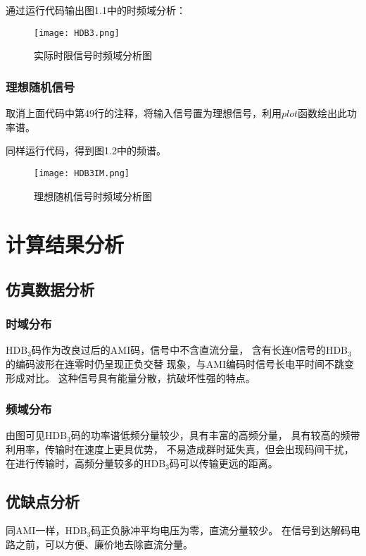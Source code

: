 \documentclass[AutoFakeBold]{LZUThesis}
\begin{document}
通过运行代码输出图1.1中的时频域分析：

\begin{figure}[htbp]
    \centering
    \texttt{[image: HDB3.png]}
    \caption{实际时限信号时频域分析图}
\end{figure}

\newpage

\subsection{理想随机信号}
取消上面代码中第49行的注释，将输入信号置为理想信号，利用$plot$函数绘出此功率谱。

同样运行代码，得到图1.2中的频谱。

\begin{figure}[htbp]
    \centering
    \texttt{[image: HDB3IM.png]}
    \caption{理想随机信号时频域分析图}
\end{figure}

\chapter{计算结果分析}

\section{仿真数据分析}

\subsection{时域分布}
$\mathrm{HDB_3}$码作为改良过后的AMI码，信号中不含直流分量，
含有长连0信号的$\mathrm{HDB_3}$的编码波形在连零时仍呈现正负交替
现象，与AMI编码时信号长电平时间不跳变形成对比。
这种信号具有能量分散，抗破坏性强的特点。

\subsection{频域分布}
    由图可见$\mathrm{HDB_3}$码的功率谱低频分量较少，具有丰富的高频分量，
    具有较高的频带利用率，传输时在速度上更具优势，
    不易造成群时延失真，但会出现码间干扰，
    在进行传输时，高频分量较多的$\mathrm{HDB_3}$码可以传输更远的距离。

\section{优缺点分析}
同AMI一样，$\mathrm{HDB_3}$码正负脉冲平均电压为零，直流分量较少。
在信号到达解码电路之前，可以方便、廉价地去除直流分量。\cite{enwiki:2}
\end{document}
